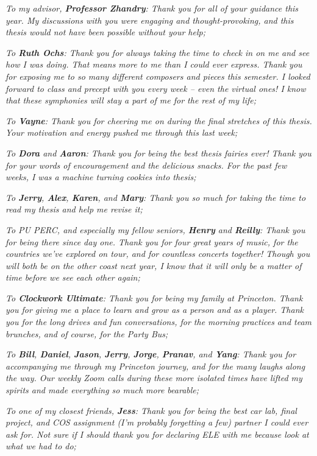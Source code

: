 \textit{To my advisor, \textbf{Professor Zhandry}: Thank you for all of your guidance this year. My discussions with you were engaging and thought-provoking, and this thesis would not have been possible without your help;}

\textit{To \textbf{Ruth Ochs}: Thank you for always taking the time to check in on me and see how I was doing. That means more to me than I could ever express. Thank you for exposing me to so many different composers and pieces this semester. I looked forward to class and precept with you every week -- even the virtual ones! I know that these symphonies will stay a part of me for the rest of my life;}

\textit{To \textbf{Vayne}: Thank you for cheering me on during the final stretches of this thesis. Your motivation and energy pushed me through this last week;}

\textit{To \textbf{Dora} and \textbf{Aaron}: Thank you for being the best thesis fairies ever! Thank you for your words of encouragement and the delicious snacks. For the past few weeks, I was a machine turning cookies into thesis;}

\textit{To \textbf{Jerry}, \textbf{Alex}, \textbf{Karen}, and \textbf{Mary}: Thank you so much for taking the time to read my thesis and help me revise it;}

\textit{To PU PERC, and especially my fellow seniors, \textbf{Henry} and \textbf{Reilly}: Thank you for being there since day one. Thank you for four great years of music, for the countries we've explored on tour, and for countless concerts together! Though you will both be on the other coast next year, I know that it will only be a matter of time before we see each other again;}

\textit{To \textbf{Clockwork Ultimate}: Thank you for being my family at Princeton. Thank you for giving me a place to learn and grow as a person and as a player. Thank you for the long drives and fun conversations, for the morning practices and team brunches, and of course, for the Party Bus;}

\textit{To \textbf{Bill}, \textbf{Daniel}, \textbf{Jason}, \textbf{Jerry}, \textbf{Jorge}, \textbf{Pranav}, and \textbf{Yang}: Thank you for accompanying me through my Princeton journey, and for the many laughs along the way. Our weekly Zoom calls during these more isolated times have lifted my spirits and made everything so much more bearable;}

\textit{To one of my closest friends, \textbf{Jess}: Thank you for being the best car lab, final project, and COS assignment (I'm probably forgetting a few) partner I could ever ask for. Not sure if I should thank you for declaring ELE with me because look at what we had to do;}

